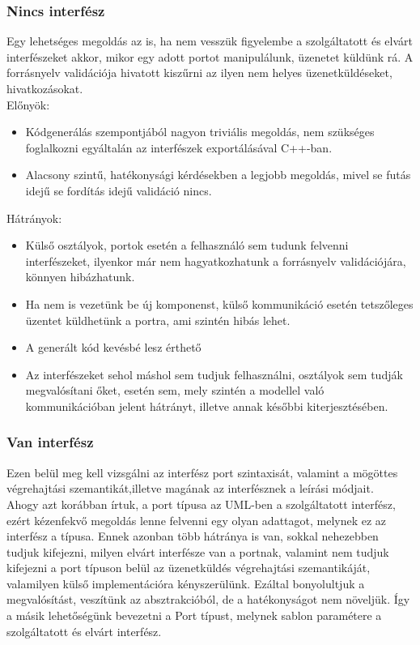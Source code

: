\documentclass[a4paper,12pt]{report}
\begin{document}
\subsubsection{Nincs interfész}
Egy lehetséges megoldás az is, ha nem vesszük figyelembe a szolgáltatott és elvárt interfészeket akkor, mikor egy adott portot manipulálunk, üzenetet küldünk rá. A forrásnyelv validációja hivatott kiszűrni az ilyen nem helyes üzenetküldéseket, hivatkozásokat. \\
Előnyök:
\begin{itemize}
\item Kódgenerálás szempontjából nagyon triviális megoldás, nem szükséges foglalkozni egyáltalán az interfészek exportálásával C++-ban.
\item Alacsony szintű, hatékonysági kérdésekben a legjobb megoldás, mivel se futás idejű se fordítás idejű validáció nincs. 
\end{itemize}
Hátrányok:
\begin{itemize}
\item Külső osztályok, portok esetén a felhasználó sem tudunk felvenni interfészeket, ilyenkor már nem hagyatkozhatunk a forrásnyelv validációjára, könnyen hibázhatunk.
\item Ha nem is vezetünk be új komponenst, külső kommunikáció esetén tetszőleges üzentet küldhetünk a portra, ami szintén hibás lehet.
\item A generált kód kevésbé lesz érthető
\item Az interfészeket sehol máshol sem tudjuk felhasználni, osztályok sem tudják megvalósítani őket, esetén sem, mely szintén a modellel való kommunikációban jelent hátrányt, illetve annak későbbi kiterjesztésében. 
\end{itemize}

\subsubsection{Van interfész}
Ezen belül meg kell vizsgálni az interfész port szintaxisát, valamint a mögöttes végrehajtási szemantikát,illetve magának az interfésznek a leírási módjait. \\
Ahogy azt korábban írtuk, a port típusa az UML-ben a szolgáltatott interfész, ezért kézenfekvő megoldás lenne felvenni egy olyan adattagot, melynek ez az interfész a típusa. Ennek azonban több hátránya is van, sokkal nehezebben tudjuk kifejezni, milyen elvárt interfésze van a portnak, valamint nem tudjuk kifejezni a port típuson belül az üzenetküldés végrehajtási szemantikáját, valamilyen külső implementációra kényszerülünk. Ezáltal bonyolultjuk a megvalósítást, veszítünk az absztrakcióból, de a hatékonyságot nem növeljük. 
Így a másik lehetőségünk bevezetni a Port típust, melynek sablon paramétere a szolgáltatott és elvárt interfész. \\
\end{document}

